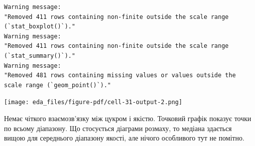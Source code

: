 \documentclass[
  letterpaper,
  DIV=11,
  numbers=noendperiod]{scrreprt}
\newenvironment{Shaded}{\begin{snugshade}}{\end{snugshade}}
\newcommand{\AttributeTok}[1]{\textcolor[rgb]{0.40,0.45,0.13}{#1}}
\newcommand{\DecValTok}[1]{\textcolor[rgb]{0.68,0.00,0.00}{#1}}
\newcommand{\FloatTok}[1]{\textcolor[rgb]{0.68,0.00,0.00}{#1}}
\newcommand{\FunctionTok}[1]{\textcolor[rgb]{0.28,0.35,0.67}{#1}}
\newcommand{\NormalTok}[1]{\textcolor[rgb]{0.00,0.23,0.31}{#1}}
\newcommand{\SpecialCharTok}[1]{\textcolor[rgb]{0.37,0.37,0.37}{#1}}
\newcommand{\StringTok}[1]{\textcolor[rgb]{0.13,0.47,0.30}{#1}}
\begin{document}
\begin{Shaded}
\end{Shaded}

\begin{verbatim}
Warning message:
"Removed 411 rows containing non-finite outside the scale range (`stat_boxplot()`)."
Warning message:
"Removed 411 rows containing non-finite outside the scale range (`stat_summary()`)."
Warning message:
"Removed 481 rows containing missing values or values outside the scale range (`geom_point()`)."
\end{verbatim}

\texttt{[image: eda\_files/figure-pdf/cell-31-output-2.png]}

Немає чіткого взаємозв'язку між цукром і якістю. Точковий графік показує
точки по всьому діапазону. Що стосується діаграми розмаху, то медіана
здається вищою для середнього діапазону якості, але нічого особливого
тут не помітно.
\end{document}
